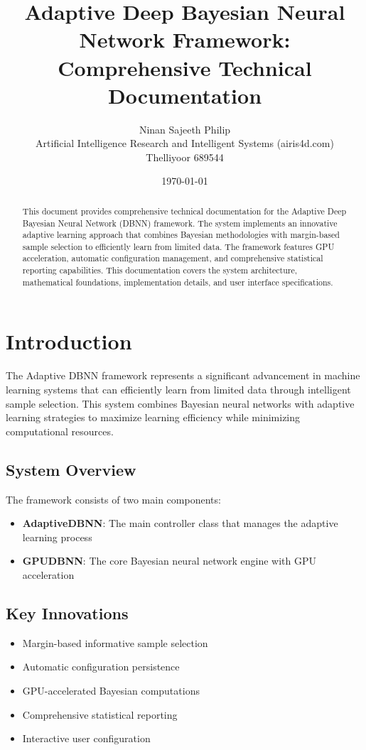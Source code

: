 \documentclass[11pt]{article}
\title{Adaptive Deep Bayesian Neural Network Framework: \\ Comprehensive Technical Documentation}
\author{Ninan Sajeeth Philip\\ Artificial Intelligence Research and Intelligent Systems (airis4d.com)\\Thelliyoor 689544}
\date{\today}
\begin{document}
\maketitle

\begin{abstract}
This document provides comprehensive technical documentation for the Adaptive Deep Bayesian Neural Network (DBNN) framework. The system implements an innovative adaptive learning approach that combines Bayesian methodologies with margin-based sample selection to efficiently learn from limited data. The framework features GPU acceleration, automatic configuration management, and comprehensive statistical reporting capabilities. This documentation covers the system architecture, mathematical foundations, implementation details, and user interface specifications.
\end{abstract}

\tableofcontents

\section{Introduction}

The Adaptive DBNN framework represents a significant advancement in machine learning systems that can efficiently learn from limited data through intelligent sample selection. This system combines Bayesian neural networks with adaptive learning strategies to maximize learning efficiency while minimizing computational resources.

\subsection{System Overview}

The framework consists of two main components:
\begin{itemize}
\item \textbf{AdaptiveDBNN}: The main controller class that manages the adaptive learning process
\item \textbf{GPUDBNN}: The core Bayesian neural network engine with GPU acceleration
\end{itemize}

\subsection{Key Innovations}

\begin{itemize}
\item Margin-based informative sample selection
\item Automatic configuration persistence
\item GPU-accelerated Bayesian computations
\item Comprehensive statistical reporting
\item Interactive user configuration
\end{itemize}
\end{document}
